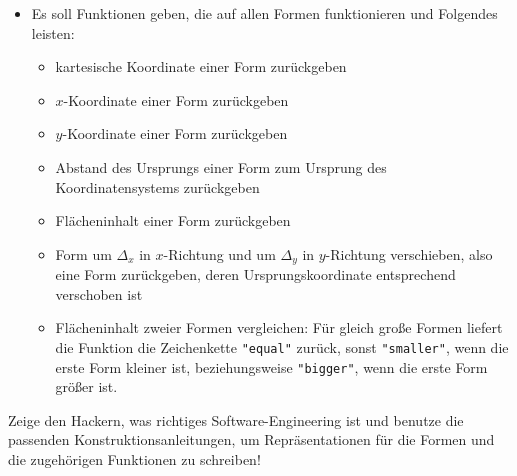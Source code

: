 \begin{aufgabe}
\begin{itemize}
  \item Es soll Funktionen geben, die auf allen Formen funktionieren
    und Folgendes leisten:

    \begin{itemize}

    \item kartesische Koordinate einer Form zurückgeben

    \item $x$-Koordinate einer Form zurückgeben

    \item $y$-Koordinate einer Form zurückgeben

    \item Abstand des Ursprungs einer Form zum Ursprung des
      Koordinatensystems zurückgeben

    \item Flächeninhalt einer Form zurückgeben

    \item Form um $\Delta_x$ in $x$-Richtung und um $\Delta_y$ in
      $y$-Richtung verschieben, also eine Form zurückgeben, deren
      Ursprungskoordinate entsprechend verschoben ist

  \item  Flächeninhalt zweier
    Formen vergleichen: Für gleich große Formen liefert die Funktion
    die Zeichenkette \lstinline{"equal"} zurück, sonst \lstinline{"smaller"}, wenn die erste
    Form kleiner ist, beziehungsweise \lstinline{"bigger"}, wenn die erste
    Form größer ist.
    \end{itemize}

  \end{itemize}
  Zeige den Hackern, was richtiges Software-Engineering ist und
  benutze die passenden Konstruktionsanleitungen, um Repräsentationen für die Formen und die zugehörigen
  Funktionen zu schreiben!
\end{aufgabe}

